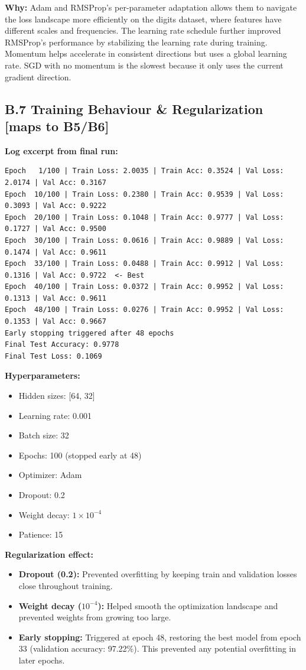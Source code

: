 \documentclass[11pt,a4paper]{article}
\begin{document}
\textbf{Why:} Adam and RMSProp's per-parameter adaptation allows them to navigate the loss landscape more efficiently on the digits dataset, where features have different scales and frequencies. The learning rate schedule further improved RMSProp's performance by stabilizing the learning rate during training. Momentum helps accelerate in consistent directions but uses a global learning rate. SGD with no momentum is the slowest because it only uses the current gradient direction.

\subsection*{B.7 Training Behaviour \& Regularization \hfill [maps to B5/B6]}

\textbf{Log excerpt from final run:}
\begin{verbatim}
Epoch   1/100 | Train Loss: 2.0035 | Train Acc: 0.3524 | Val Loss: 2.0174 | Val Acc: 0.3167
Epoch  10/100 | Train Loss: 0.2380 | Train Acc: 0.9539 | Val Loss: 0.3093 | Val Acc: 0.9222
Epoch  20/100 | Train Loss: 0.1048 | Train Acc: 0.9777 | Val Loss: 0.1727 | Val Acc: 0.9500
Epoch  30/100 | Train Loss: 0.0616 | Train Acc: 0.9889 | Val Loss: 0.1474 | Val Acc: 0.9611
Epoch  33/100 | Train Loss: 0.0488 | Train Acc: 0.9912 | Val Loss: 0.1316 | Val Acc: 0.9722  <- Best
Epoch  40/100 | Train Loss: 0.0372 | Train Acc: 0.9952 | Val Loss: 0.1313 | Val Acc: 0.9611
Epoch  48/100 | Train Loss: 0.0276 | Train Acc: 0.9952 | Val Loss: 0.1353 | Val Acc: 0.9667
Early stopping triggered after 48 epochs
Final Test Accuracy: 0.9778
Final Test Loss: 0.1069
\end{verbatim}

\textbf{Hyperparameters:}
\begin{itemize}
    \item Hidden sizes: [64, 32]
    \item Learning rate: 0.001
    \item Batch size: 32
    \item Epochs: 100 (stopped early at 48)
    \item Optimizer: Adam
    \item Dropout: 0.2
    \item Weight decay: $1 \times 10^{-4}$
    \item Patience: 15
\end{itemize}

\textbf{Regularization effect:}
\begin{itemize}
    \item \textbf{Dropout (0.2):} Prevented overfitting by keeping train and validation losses close throughout training.
    \item \textbf{Weight decay ($10^{-4}$):} Helped smooth the optimization landscape and prevented weights from growing too large.
    \item \textbf{Early stopping:} Triggered at epoch 48, restoring the best model from epoch 33 (validation accuracy: 97.22\%). This prevented any potential overfitting in later epochs.
\end{itemize}
\end{document}
